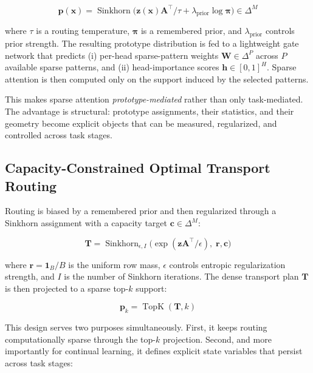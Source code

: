 \documentclass[11pt,a4paper]{article}
\theoremstyle{definition}
\DeclareMathOperator{\Sinkhorn}{Sinkhorn}
\DeclareMathOperator{\TopK}{TopK}
\begin{document}
\begin{equation}
\mathbf{p}(\mathbf{x}) = \Sinkhorn\!\Big(\mathbf{z}(\mathbf{x}) \mathbf{A}^\top / \tau + \lambda_{\text{prior}} \log \boldsymbol{\pi}\Big) \in \Delta^{M}
\end{equation}

where $\tau$ is a routing temperature, $\boldsymbol{\pi}$ is a remembered prior, and $\lambda_{\text{prior}}$ controls prior strength. The resulting prototype distribution is fed to a lightweight gate network that predicts (i) per-head sparse-pattern weights $\mathbf{W} \in \Delta^{P}$ across $P$ available sparse patterns, and (ii) head-importance scores $\mathbf{h} \in [0,1]^{H}$. Sparse attention is then computed only on the support induced by the selected patterns.

This makes sparse attention \textit{prototype-mediated} rather than only task-mediated. The advantage is structural: prototype assignments, their statistics, and their geometry become explicit objects that can be measured, regularized, and controlled across task stages.

\subsection{Capacity-Constrained Optimal Transport Routing}
\label{sec:sinkhorn}

Routing is biased by a remembered prior and then regularized through a Sinkhorn assignment with a capacity target $\mathbf{c} \in \Delta^{M}$:

\begin{equation}
\mathbf{T} = \Sinkhorn_{\epsilon, I}\!\Big(\exp(\mathbf{z}\mathbf{A}^\top / \epsilon),\; \mathbf{r}, \mathbf{c}\Big)
\end{equation}

where $\mathbf{r} = \mathbf{1}_B / B$ is the uniform row mass, $\epsilon$ controls entropic regularization strength, and $I$ is the number of Sinkhorn iterations. The dense transport plan $\mathbf{T}$ is then projected to a sparse top-$k$ support:

\begin{equation}
\mathbf{p}_k = \TopK(\mathbf{T}, k)
\end{equation}

This design serves two purposes simultaneously. First, it keeps routing computationally sparse through the top-$k$ projection. Second, and more importantly for continual learning, it defines explicit state variables that persist across task stages:
\end{document}
